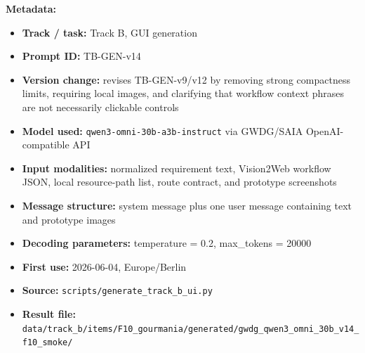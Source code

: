 \textbf{Metadata:}
\begin{itemize}
  \item \textbf{Track / task:} Track B, GUI generation
  \item \textbf{Prompt ID:} TB-GEN-v14
  \item \textbf{Version change:} revises TB-GEN-v9/v12 by removing strong
  compactness limits, requiring local images, and clarifying that workflow
  context phrases are not necessarily clickable controls
  \item \textbf{Model used:} \texttt{qwen3-omni-30b-a3b-instruct} via
  GWDG/SAIA OpenAI-compatible API
  \item \textbf{Input modalities:} normalized requirement text, Vision2Web
  workflow JSON, local resource-path list, route contract, and prototype
  screenshots
  \item \textbf{Message structure:} system message plus one user message
  containing text and prototype images
  \item \textbf{Decoding parameters:} temperature = 0.2, max\_tokens = 20000
  \item \textbf{First use:} 2026-06-04, Europe/Berlin
  \item \textbf{Source:} \texttt{scripts/generate\_track\_b\_ui.py}
  \item \textbf{Result file:}
  \texttt{data/track\_b/items/F10\_gourmania/generated/gwdg\_qwen3\_omni\_30b\_v14\_f10\_smoke/}
\end{itemize}

